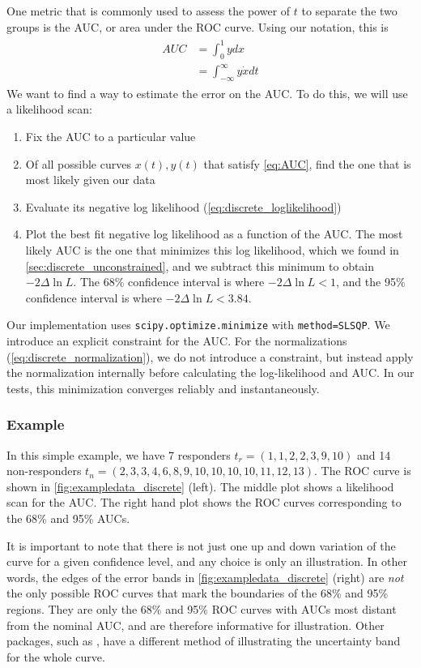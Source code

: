 \documentclass[11pt]{article}
\newcommand{\xdot}{\dot{x}}
\newcommand{\AUC}{AUC}
\begin{document}
One metric that is commonly used to assess the power of \(t\) to separate the two groups is the AUC, or area under the ROC curve.  Using our notation, this is
\begin{align}
	\begin{aligned}
		\AUC&=\int_{0}^{1}ydx\\
		&=\int_{-\infty}^{\infty}y\xdot dt \label{eq:AUC}
	\end{aligned}
\end{align}
We want to find a way to estimate the error on the AUC.  To do this, we will use a likelihood scan:
\begin{enumerate}
	\item Fix the AUC to a particular value
	\item Of all possible curves \(x(t), y(t)\) that satisfy \cref{eq:AUC}, find the one that is most likely given our data
	\item Evaluate its negative log likelihood (\cref{eq:discrete_loglikelihood})
	\item Plot the best fit negative log likelihood as a function of the AUC.  The most likely AUC is the one that minimizes this log likelihood, which we found in \cref{sec:discrete_unconstrained}, and we subtract this minimum to obtain \(-2\Delta\ln{L}\).  The 68\% confidence interval is where \(-2\Delta\ln{L}<1\), and the 95\% confidence interval is where \(-2\Delta\ln{L}<3.84\).
\end{enumerate}

Our implementation uses \texttt{scipy.optimize.minimize} with \texttt{method=SLSQP}.  We introduce an explicit constraint for the AUC.  For the normalizations (\cref{eq:discrete_normalization}), we do not introduce a constraint, but instead apply the normalization internally before calculating the log-likelihood and AUC.  In our tests, this minimization converges reliably and instantaneously.

\subsubsection{Example}

In this simple example, we have 7 responders \(t_r=(1, 1, 2, 2, 3, 9, 10)\) and 14 non-responders \(t_n=(2, 3, 3, 4, 6, 8, 9, 10, 10, 10, 10, 11, 12, 13)\).  The ROC curve is shown in \cref{fig:exampledata_discrete} (left).  The middle plot shows a likelihood scan for the AUC.  The right hand plot shows the ROC curves corresponding to the 68\% and 95\% AUCs.

It is important to note that there is not just one up and down variation of the curve for a given confidence level, and any choice is only an illustration.  In other words, the edges of the error bands in \cref{fig:exampledata_discrete} (right) are \emph{not} the only possible ROC curves that mark the boundaries of the 68\% and 95\% regions.  They are only the 68\% and 95\% ROC curves with AUCs most distant from the nominal AUC, and are therefore informative for illustration.  Other packages, such as \autocite{roc_fernandez}, have a different method of illustrating the uncertainty band for the whole curve.
\end{document}
